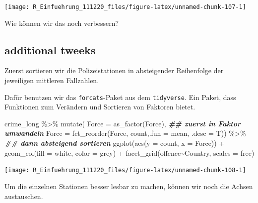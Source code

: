 \documentclass[
]{book}
\newenvironment{Shaded}{\begin{snugshade}}{\end{snugshade}}
\newcommand{\AttributeTok}[1]{\textcolor[rgb]{0.77,0.63,0.00}{#1}}
\newcommand{\DocumentationTok}[1]{\textcolor[rgb]{0.56,0.35,0.01}{\textbf{\textit{#1}}}}
\newcommand{\FunctionTok}[1]{\textcolor[rgb]{0.00,0.00,0.00}{#1}}
\newcommand{\NormalTok}[1]{#1}
\newcommand{\SpecialCharTok}[1]{\textcolor[rgb]{0.00,0.00,0.00}{#1}}
\newcommand{\StringTok}[1]{\textcolor[rgb]{0.31,0.60,0.02}{#1}}
\begin{document}
\begin{center}\texttt{[image: R\_Einfuehrung\_111220\_files/figure-latex/unnamed-chunk-107-1]} \end{center}

Wie können wir das noch verbessern?

\hypertarget{additional-tweeks}{%
\subsection{additional tweeks}\label{additional-tweeks}}

Zuerst sortieren wir die Polizeistationen in absteigender Reihenfolge der jeweiligen mittleren Fallzahlen.

Dafür benutzen wir das \texttt{forcats}-Paket aus dem \texttt{tidyverse}. Ein Paket, dass Funktionen zum Verändern und Sortieren von Faktoren bietet.

\begin{Shaded}
\begin{Highlighting}[]
\NormalTok{crime\_long }\SpecialCharTok{\%\textgreater{}\%} 
  \FunctionTok{mutate}\NormalTok{(}
      \AttributeTok{Force =} \FunctionTok{as\_factor}\NormalTok{(Force), }\DocumentationTok{\#\# zuerst in Faktor umwandeln}
      \AttributeTok{Force =} \FunctionTok{fct\_reorder}\NormalTok{(Force, count,}\AttributeTok{.fun =}\NormalTok{ mean, }\AttributeTok{.desc =}\NormalTok{ T)) }\SpecialCharTok{\%\textgreater{}\%} \DocumentationTok{\#\# dann absteigend sortieren}
\FunctionTok{ggplot}\NormalTok{(}\FunctionTok{aes}\NormalTok{(}\AttributeTok{y =}\NormalTok{ count,}
             \AttributeTok{x =}\NormalTok{ Force)) }\SpecialCharTok{+}
  \FunctionTok{geom\_col}\NormalTok{(}\AttributeTok{fill =} \StringTok{\textquotesingle{}white\textquotesingle{}}\NormalTok{,}
           \AttributeTok{color =} \StringTok{\textquotesingle{}grey\textquotesingle{}}\NormalTok{) }\SpecialCharTok{+}
  \FunctionTok{facet\_grid}\NormalTok{(offence}\SpecialCharTok{\textasciitilde{}}\NormalTok{Country, }
             \AttributeTok{scales =} \StringTok{\textquotesingle{}free\textquotesingle{}}\NormalTok{)}
\end{Highlighting}
\end{Shaded}

\begin{center}\texttt{[image: R\_Einfuehrung\_111220\_files/figure-latex/unnamed-chunk-108-1]} \end{center}

Um die einzelnen Stationen besser lesbar zu machen, können wir noch die Achsen austauschen.
\end{document}

